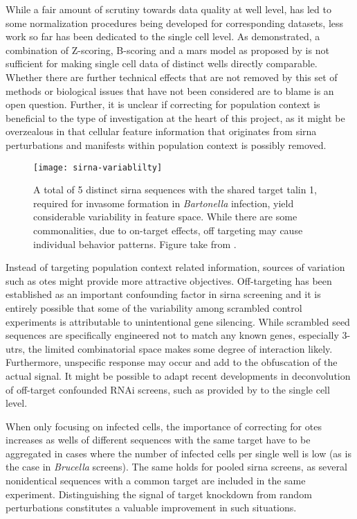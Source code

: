 While a fair amount of scrutiny towards data quality at well level, has led to some normalization procedures being developed for corresponding datasets, less work so far has been dedicated to the single cell level. As demonstrated, a combination of Z-scoring, B-scoring and a \gls{mars} model as proposed by \cite{Knapp2011} is not sufficient for making single cell data of distinct wells directly comparable. Whether there are further technical effects that are not removed by this set of methods or biological issues that have not been considered are to blame is an open question. Further, it is unclear if correcting for population context is beneficial to the type of investigation at the heart of this project, as it might be overzealous in that cellular feature information that originates from \gls{sirna} perturbations and manifests within population context is possibly removed.

\begin{figure}
  \centering
  \texttt{[image: sirna-variablilty]}
  \caption[Feature space variability of different \gls{sirna} sequences sharing the same target gene.]{A total of 5 distinct \gls{sirna} sequences with the shared target talin 1, required for invasome formation in \textit{Bartonella} infection, yield considerable variability in feature space. While there are some commonalities, due to on-target effects, off targeting may cause individual behavior patterns. Figure take from \cite{Geier2010}.}
  \label{fig:sirna-variablilty}
\end{figure}

Instead of targeting population context related information, sources of variation such as \glspl{ote} might provide more attractive objectives. Off-targeting has been established as an important confounding factor in \gls{sirna} screening and it is entirely possible that some of the variability among scrambled control experiments is attributable to unintentional gene silencing. While scrambled seed sequences are specifically engineered not to match any known genes, especially \glspl{3-utr}, the limited combinatorial space makes some degree of interaction likely. Furthermore, unspecific response may occur and add to the obfuscation of the actual signal. It might be possible to adapt recent developments in deconvolution of off-target confounded RNAi screens, such as provided by \cite{Schmich2015} to the single cell level.

When only focusing on infected cells, the importance of correcting for \glspl{ote} increases as wells of different sequences with the same target have to be aggregated in cases where the number of infected cells per single well is low (as is the case in \textit{Brucella} screens). The same holds for pooled \gls{sirna} screens, as several nonidentical sequences with a common target are included in the same experiment. Distinguishing the signal of target knockdown from random perturbations constitutes a valuable improvement in such situations.

